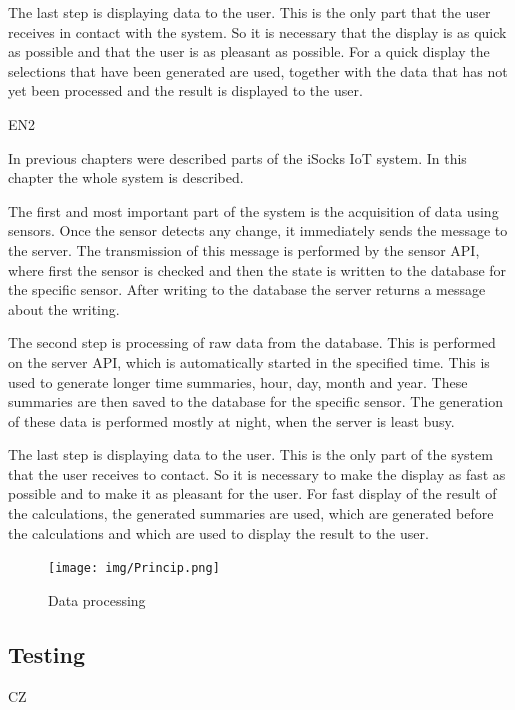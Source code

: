 \documentclass[12pt, a4paper]{article}
\begin{document}
The last step is displaying data to the user.
This is the only part that the user receives in contact with the system.
So it is necessary that the display is as quick as possible and that the user is as pleasant as possible.
For a quick display the selections that have been generated are used, together with the data that has not yet been processed and the result is displayed to the user.

EN2

In previous chapters were described parts of the iSocks IoT system.
In this chapter the whole system is described.

The first and most important part of the system is the acquisition of data using sensors.
Once the sensor detects any change, it immediately sends the message to the server.
The transmission of this message is performed by the sensor API, where first the sensor is checked and then the state is written to the database for the specific sensor.
After writing to the database the server returns a message about the writing.

The second step is processing of raw data from the database.
This is performed on the server API, which is automatically started in the specified time.
This is used to generate longer time summaries, hour, day, month and year.
These summaries are then saved to the database for the specific sensor.
The generation of these data is performed mostly at night, when the server is least busy.

The last step is displaying data to the user.
This is the only part of the system that the user receives to contact.
So it is necessary to make the display as fast as possible and to make it as pleasant for the user.
For fast display of the result of the calculations, the generated summaries are used, which are generated before the calculations and which are used to display the result to the user.



\begin{figure}[t]
    \centering
    \texttt{[image: img/Princip.png]}
    \caption{Data processing}
    \label{fig:princip}
\end{figure}


\subsection*{Testing}

CZ
\end{document}
